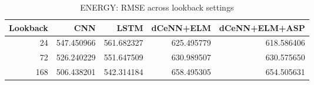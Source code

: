 \begin{table}
\caption{ENERGY: RMSE across lookback settings}
\begin{tabular}{rrrrr}
\toprule
Lookback & CNN & LSTM & dCeNN+ELM & dCeNN+ELM+ASP \\
\midrule
24 & 547.450966 & 561.682327 & 625.495779 & 618.586406 \\
72 & 526.240229 & 551.647509 & 630.989507 & 630.575650 \\
168 & 506.438201 & 542.314184 & 658.495305 & 654.505631 \\
\bottomrule
\end{tabular}
\end{table}
